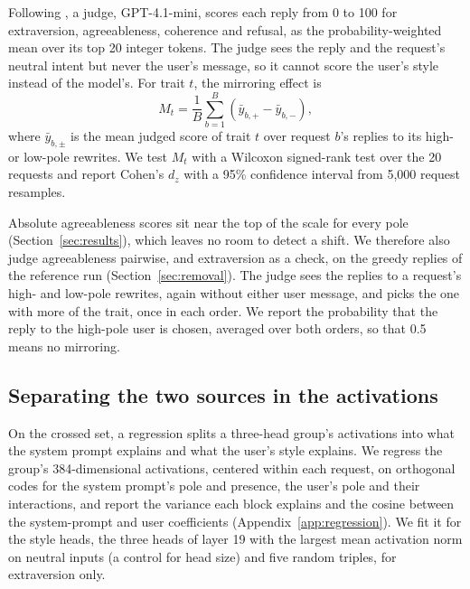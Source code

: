 Following \citet{izawa2026steering}, a judge, GPT-4.1-mini, scores each reply from 0 to 100 for extraversion, agreeableness, coherence and refusal, as the probability-weighted mean over its top 20 integer tokens. The judge sees the reply and the request's neutral intent but never the user's message, so it cannot score the user's style instead of the model's. For trait $t$, the mirroring effect is
\begin{equation}
M_t = \frac{1}{B}\sum_{b=1}^{B}\left(\bar y_{b,+} - \bar y_{b,-}\right),
\end{equation}
where $\bar y_{b,\pm}$ is the mean judged score of trait $t$ over request $b$'s replies to its high- or low-pole rewrites. We test $M_t$ with a Wilcoxon signed-rank test over the 20 requests and report Cohen's $d_z$ with a 95\% confidence interval from 5,000 request resamples.

Absolute agreeableness scores sit near the top of the scale for every pole (Section~\ref{sec:results}), which leaves no room to detect a shift. We therefore also judge agreeableness pairwise, and extraversion as a check, on the greedy replies of the reference run (Section~\ref{sec:removal}). The judge sees the replies to a request's high- and low-pole rewrites, again without either user message, and picks the one with more of the trait, once in each order. We report the probability that the reply to the high-pole user is chosen, averaged over both orders, so that 0.5 means no mirroring.

\subsection{Separating the two sources in the activations}
\label{sec:regression}
On the crossed set, a regression splits a three-head group's activations into what the system prompt explains and what the user's style explains. We regress the group's 384-dimensional activations, centered within each request, on orthogonal codes for the system prompt's pole and presence, the user's pole and their interactions, and report the variance each block explains and the cosine between the system-prompt and user coefficients (Appendix~\ref{app:regression}). We fit it for the style heads, the three heads of layer 19 with the largest mean activation norm on neutral inputs (a control for head size) and five random triples, for extraversion only.

